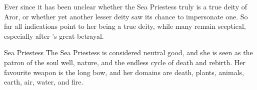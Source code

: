 
Ever since it has been unclear whether the Sea Priestess truly is a true deity
of Aror, or whether yet another lesser deity saw its chance to impersonate
one. So far all indications point to her being a true deity, while many remain
sceptical, especially after 's great betrayal.

\begin{35e}{Sea Priestess}
  The Sea Priestess is considered neutral good, and she is seen as the patron
  of the soul well, nature, and the endless cycle of death and rebirth. Her
  favourite weapon is the long bow, and her domains are death, plants,
  animals, earth, air, water, and fire.
\end{35e}
